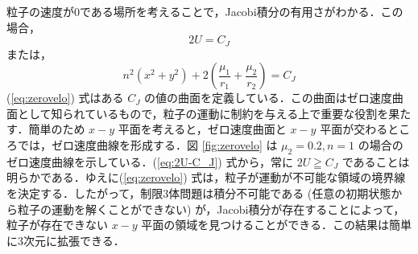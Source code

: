 \documentclass[11pt,a4paper,oneside,onecolumn]{jarticle}
\begin{document}
粒子の速度が0である場所を考えることで，Jacobi積分の有用さがわかる．この場合，
\begin{equation}
2 U = C_J
\end{equation}
または，
\begin{equation}
n^2 (x^2 + y^2) + 2 \left( \frac{\mu_1}{r_1} + \frac{\mu_2}{r_2} \right) = C_J \label{eq:zerovelo}
\end{equation}
(\ref{eq:zerovelo}) 式はある $C_J$ の値の曲面を定義している．この曲面はゼロ速度曲面として知られているもので，粒子の運動に制約を与える上で重要な役割を果たす．簡単のため $x-y$ 平面を考えると，ゼロ速度曲面と $x-y$ 平面が交わるところでは，ゼロ速度曲線を形成する．図 \ref{fig:zerovelo} は $\mu_2 = 0.2, n = 1$ の場合のゼロ速度曲線を示している．(\ref{eq:2U-C_J}) 式から，常に $2 U \geqq C_J$ であることは明らかである．ゆえに(\ref{eq:zerovelo}) 式は，粒子が運動が不可能な領域の境界線を決定する．したがって，制限3体問題は積分不可能である (任意の初期状態から粒子の運動を解くことができない) が，Jacobi積分が存在することによって，粒子が存在できない $x-y$ 平面の領域を見つけることができる．この結果は簡単に3次元に拡張できる．
\end{document}
